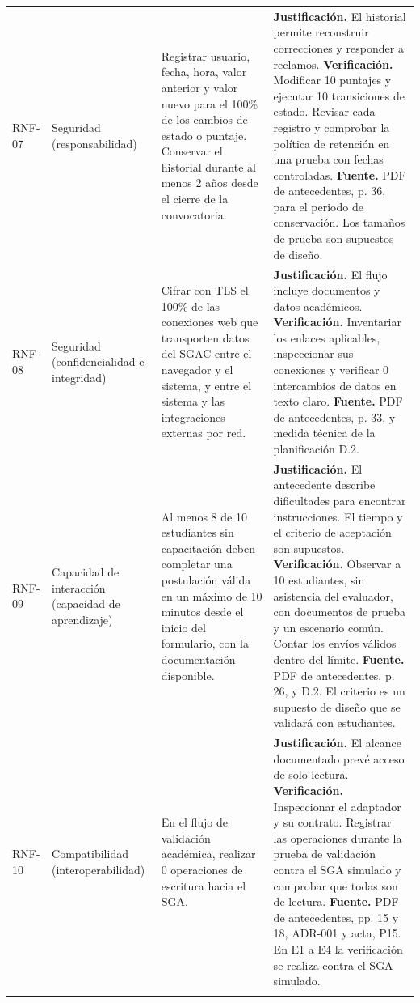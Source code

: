 \begin{longtable}{@{}>{\raggedright\arraybackslash}p{.13\linewidth}>{\raggedright\arraybackslash}p{.17\linewidth}>{\raggedright\arraybackslash}p{.25\linewidth}>{\raggedright\arraybackslash}p{.32\linewidth}@{}}
RNF-07 & Seguridad (responsabilidad) & Registrar usuario, fecha, hora, valor anterior y valor nuevo para el 100\% de los cambios de estado o puntaje. Conservar el historial durante al menos 2 años desde el cierre de la convocatoria. & \textbf{Justificación.} El historial permite reconstruir correcciones y responder a reclamos. \textbf{Verificación.} Modificar 10 puntajes y ejecutar 10 transiciones de estado. Revisar cada registro y comprobar la política de retención en una prueba con fechas controladas. \textbf{Fuente.} PDF de antecedentes, p. 36, para el periodo de conservación. Los tamaños de prueba son supuestos de diseño. \\ \addlinespace
RNF-08 & Seguridad (confidencialidad e integridad) & Cifrar con TLS el 100\% de las conexiones web que transporten datos del SGAC entre el navegador y el sistema, y entre el sistema y las integraciones externas por red. & \textbf{Justificación.} El flujo incluye documentos y datos académicos. \textbf{Verificación.} Inventariar los enlaces aplicables, inspeccionar sus conexiones y verificar 0 intercambios de datos en texto claro. \textbf{Fuente.} PDF de antecedentes, p. 33, y medida técnica de la planificación D.2. \\ \addlinespace
RNF-09 & Capacidad de interacción (capacidad de aprendizaje) & Al menos 8 de 10 estudiantes sin capacitación deben completar una postulación válida en un máximo de 10 minutos desde el inicio del formulario, con la documentación disponible. & \textbf{Justificación.} El antecedente describe dificultades para encontrar instrucciones. El tiempo y el criterio de aceptación son supuestos. \textbf{Verificación.} Observar a 10 estudiantes, sin asistencia del evaluador, con documentos de prueba y un escenario común. Contar los envíos válidos dentro del límite. \textbf{Fuente.} PDF de antecedentes, p. 26, y D.2. El criterio es un supuesto de diseño que se validará con estudiantes. \\ \addlinespace
RNF-10 & Compatibilidad (interoperabilidad) & En el flujo de validación académica, realizar 0 operaciones de escritura hacia el SGA. & \textbf{Justificación.} El alcance documentado prevé acceso de solo lectura. \textbf{Verificación.} Inspeccionar el adaptador y su contrato. Registrar las operaciones durante la prueba de validación contra el SGA simulado y comprobar que todas son de lectura. \textbf{Fuente.} PDF de antecedentes, pp. 15 y 18, ADR-001 y acta, P15. En E1 a E4 la verificación se realiza contra el SGA simulado. \\ \addlinespace

\end{longtable}
